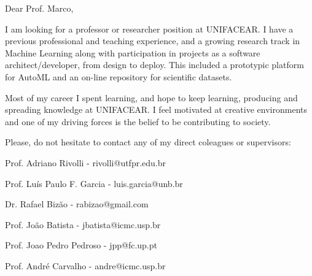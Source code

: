 \documentclass[letterpaper,11pt]{article}
\begin{document}
\vspace{40pt}

{\justifying
\Large
{}
Dear Prof. Marco,
\vspace{10pt}

% 

I am looking for a professor or researcher position at UNIFACEAR.
I have a previous professional and teaching experience, and a growing research track in Machine Learning along with participation in projects as a software architect/developer, from design to deploy.
This included a prototypic platform for AutoML and an on-line repository for scientific datasets.

}

{\justifying
\Large
{}

Most of my career I spent learning, and hope to keep learning, producing and spreading knowledge at UNIFACEAR.
I feel motivated at creative environments and one of my driving forces is the belief to be contributing to society.

\vspace{20pt}

Please, do not hesitate to contact any of my direct coleagues or supervisors:

Prof. Adriano Rivolli - rivolli@utfpr.edu.br

Prof. Luís Paulo F. Garcia - luis.garcia@unb.br

Dr. Rafael Bizão - rabizao@gmail.com

Prof. João Batista - jbatista@icmc.usp.br

Prof. Joao Pedro Pedroso - jpp@fc.up.pt

Prof. André Carvalho - andre@icmc.usp.br

}
\end{document}
